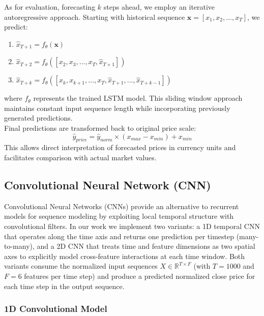 \documentclass[sigconf]{acmart}
\begin{document}
As for evaluation, forecasting $k$ steps ahead, we employ an iterative autoregressive approach. Starting with historical sequence $\mathbf{x} = [x_1, x_2, \ldots, x_T]$, we predict:
\begin{enumerate}
  \item $\hat{x}_{T+1} = f_\theta(\mathbf{x})$
  \item $\hat{x}_{T+2} = f_\theta([x_2, x_3, \ldots, x_T, \hat{x}_{T+1}])$
  \item $\hat{x}_{T+k} = f_\theta([x_{k}, x_{k+1}, \ldots, x_T, \hat{x}_{T+1}, \ldots, \hat{x}_{T+k-1}])$
\end{enumerate}
where $f_\theta$ represents the trained LSTM model. This sliding window approach maintains constant input sequence length while incorporating previously generated predictions.\\

Final predictions are transformed back to original price scale:
$$\hat{y}_{price} = \hat{y}_{norm} \times (x_{max} - x_{min}) + x_{min}$$
This allows direct interpretation of forecasted prices in currency units and facilitates comparison with actual market values.

\subsection{Convolutional Neural Network (CNN)}
Convolutional Neural Networks (CNNs) provide an alternative to recurrent models for sequence modeling by exploiting local temporal structure with convolutional filters. In our work we implement two variants: a 1D temporal CNN that operates along the time axis and returns one prediction per timestep (many-to-many), and a 2D CNN that treats time and feature dimensions as two spatial axes to explicitly model cross-feature interactions at each time window. Both variants consume the normalized input sequences $X \in \mathbb{R}^{T\times F}$ (with $T=1000$ and $F=6$ features per time step) and produce a predicted normalized close price for each time step in the output sequence.

\subsubsection{1D Convolutional Model}
\end{document}
